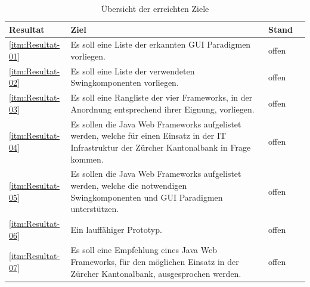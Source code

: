   \begin{table}[ht]
    \sffamily 
    \begin{center}
      \begin{tabular}{lp{9cm}ll}
        \toprule
        Resultat & Ziel & Stand \\
        \midrule
        \ref{itm:Resultat-01} &
          Es soll eine Liste der erkannten GUI Paradigmen vorliegen. &
          offen\\
        \ref{itm:Resultat-02} &
          Es soll eine Liste der verwendeten Swingkomponenten vorliegen. &
          offen\\
        \ref{itm:Resultat-03} &
          Es soll eine Rangliste der vier Frameworks, in der Anordnung
          entsprechend ihrer Eignung, vorliegen. &
          offen\\
        \ref{itm:Resultat-04} &
          Es sollen die Java Web Frameworks aufgelistet werden, welche für
          einen Einsatz in der IT Infrastruktur der Zürcher Kantonalbank in
          Frage kommen. &
          offen\\
        \ref{itm:Resultat-05} &
          Es sollen die Java Web Frameworks aufgelistet werden, welche die
          notwendigen Swingkomponenten und GUI Paradigmen unterstützen. &
          offen\\
        \ref{itm:Resultat-06} &
          Ein lauffähiger Prototyp. &
          offen\\
        \ref{itm:Resultat-07} &
          Es soll eine Empfehlung eines Java Web Frameworks, für den möglichen
          Einsatz in der Zürcher Kantonalbank, ausgesprochen werden. &
          offen\\
        \bottomrule
      \end{tabular}
      \caption{Übersicht der erreichten Ziele}
      \label{tab:erreichteZiele}
    \end{center}
  \end{table}